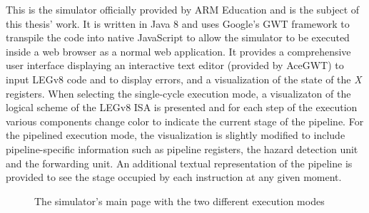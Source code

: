 This is the simulator officially provided by ARM Education and is the subject of this thesis' work. It is written in Java 8 and uses Google's GWT framework to transpile the code into native JavaScript to allow the simulator to be executed inside a web browser as a normal web application. It provides a comprehensive user interface displaying an interactive text editor (provided by AceGWT) to input LEGv8 code and to display errors, and a visualization of the state of the \emph{X} registers.
When selecting the single-cycle execution mode, a visualizaton of the logical scheme of the LEGv8 ISA is presented and for each step of the execution various components change color to indicate the current stage of the pipeline. For the pipelined execution mode, the visualization is slightly modified to include pipeline-specific information such as pipeline registers, the hazard detection unit and the forwarding unit. An additional textual representation of the pipeline is provided to see the stage occupied by each instruction at any given moment.

\begin{figure}[H]
	\centering
	
	\caption{The simulator's main page with the two different execution modes}
\end{figure}


